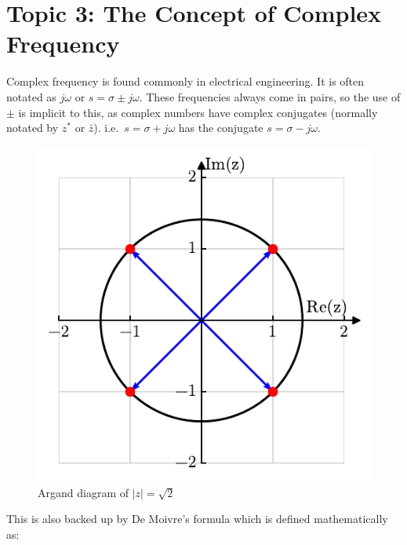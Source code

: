\documentclass[
  12pt,
  a4paper,
]{report}
\begin{document}
\newpage{}

\label{topic3}
\section{Topic 3: The Concept of Complex
Frequency}\label{topic-3-the-concept-of-complex-frequency}

Complex frequency is found commonly in electrical engineering. It is
often notated as \(j\omega\) or \(s = \sigma \pm j\omega\). These
frequencies always come in pairs, so the use of \(\pm\) is implicit to
this, as complex numbers have complex conjugates (normally notated by
\(z^*\) or \(\bar{z}\)). i.e.~\(s = \sigma + j\omega\) has the conjugate
\(s=\sigma - j\omega\).

\label{argand-figure}
\begin{figure}

{\centering \includegraphics{notes-main_files/figure-pdf/figargand-output-1.pdf}

}

\caption{Argand diagram of \(|z| = \sqrt{2}\)}

\end{figure}%

\label{de-moivre-formula}
This is also backed up by De Moivre's formula which is defined
mathematically as:
\end{document}
